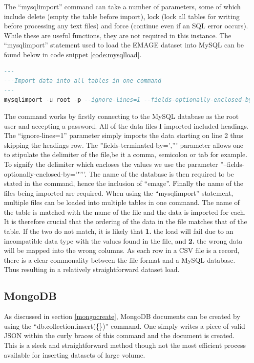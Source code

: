 The ``mysqlimport'' command can take a number of parameters, some of which include delete (empty the table before import), lock (lock all tables for writing before processing any text files) and force (continue even if an SQL error occurs). While these are useful functions, they are not required in this instance. The ``mysqlimport'' statement used to load the EMAGE dataset into MySQL can be found below in code snippet \ref{code:mysqlload}.
\begin{lstlisting}[language=SQL, caption=Command used to load data into the MySQL database., label=code:mysqlload]
---
---Import data into all tables in one command
---
mysqlimport -u root -p --ignore-lines=1 --fields-optionally-enclosed-by='"' --fields-terminated-by=',' emage assays.csv publications.csv sources.csv specimens.csv stages.csv textannotations.csv genes.csv anatomystructures.csv
\end{lstlisting}
\parindent 0pt
The command works by firstly connecting to the MySQL database as the root user and accepting a password. All of the data files I imported included headings. The ``ignore-lines=1'' parameter simply imports the data starting on line 2 thus skipping the headings row. The ''fields-terminated-by=',''' parameter allows one to stipulate the delimiter of the file,be it a comma, semicolon or tab for example. To signify the delimiter which encloses the values we use the parameter ''--fields-optionally-enclosed-by='"'''. The name of the database is then required to be stated in the command, hence the inclusion of ``emage''. Finally the name of the files being imported are required. When using the ``mysqlimport'' statement, multiple files can be loaded into multiple tables in one command. The name of the table is matched with the name of the file and the data is imported for each. It is therefore crucial that the ordering of the data in the file matches that of the table. If the two do not match, it is likely that \textbf{1.} the load will fail due to an incompatible data type with the values found in the file, and \textbf{2.} the wrong data will be mapped into the wrong columns. As each row in a CSV file is a record, there is a clear commonality between the file format and a MySQL database. Thus resulting in a relatively straightforward dataset load.
\parindent 15pt

\subsection{MongoDB}\label{mongoload}
As discussed in section \ref{mongocreate}, MongoDB documents can be created by using the ``db.collection.insert(\{\})'' command. One simply writes a piece of valid JSON within the curly braces of this command and the document is created. This is a sleek and straightforward method though not the most efficient process available for inserting datasets of large volume.

